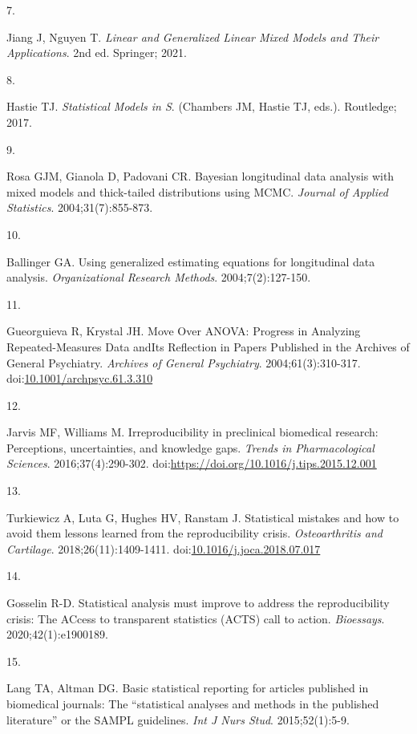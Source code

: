 \documentclass[
]{article}
\newlength{\cslhangindent}
\newlength{\csllabelwidth}
\newlength{\cslentryspacingunit} %
\newenvironment{CSLReferences}[2] %
 {%
  \setlength{\parindent}{0pt}
  \ifodd #1
  \let\oldpar\par
  \def\par{\hangindent=\cslhangindent\oldpar}
  \fi
  \setlength{\parskip}{#2\cslentryspacingunit}
 }%
 {}
\newcommand{\CSLLeftMargin}[1]{\parbox[t]{\csllabelwidth}{#1}}
\newcommand{\CSLRightInline}[1]{\parbox[t]{\linewidth - \csllabelwidth}{#1}\break}
\begin{document}
\begin{CSLReferences}{0}{0}
\leavevmode{}%
\CSLLeftMargin{7. }%
\CSLRightInline{Jiang J, Nguyen T. \emph{Linear and Generalized Linear
Mixed Models and Their Applications}. 2nd ed. Springer; 2021.}

\leavevmode{}%
\CSLLeftMargin{8. }%
\CSLRightInline{Hastie TJ. \emph{Statistical Models in {S}}. (Chambers
JM, Hastie TJ, eds.). Routledge; 2017.}

\leavevmode{}%
\CSLLeftMargin{9. }%
\CSLRightInline{Rosa GJM, Gianola D, Padovani CR. Bayesian longitudinal
data analysis with mixed models and thick-tailed distributions using
{MCMC}. \emph{Journal of Applied Statistics}. 2004;31(7):855-873.}

\leavevmode{}%
\CSLLeftMargin{10. }%
\CSLRightInline{Ballinger GA. Using generalized estimating equations for
longitudinal data analysis. \emph{Organizational Research Methods}.
2004;7(2):127-150.}

\leavevmode{}%
\CSLLeftMargin{11. }%
\CSLRightInline{Gueorguieva R, Krystal JH. {Move Over ANOVA: Progress in
Analyzing Repeated-Measures Data andIts Reflection in Papers Published
in the Archives of General Psychiatry}. \emph{Archives of General
Psychiatry}. 2004;61(3):310-317.
doi:\href{https://doi.org/10.1001/archpsyc.61.3.310}{10.1001/archpsyc.61.3.310}}

\leavevmode{}%
\CSLLeftMargin{12. }%
\CSLRightInline{Jarvis MF, Williams M. Irreproducibility in preclinical
biomedical research: Perceptions, uncertainties, and knowledge gaps.
\emph{Trends in Pharmacological Sciences}. 2016;37(4):290-302.
doi:\url{https://doi.org/10.1016/j.tips.2015.12.001}}

\leavevmode{}%
\CSLLeftMargin{13. }%
\CSLRightInline{Turkiewicz A, Luta G, Hughes HV, Ranstam J. Statistical
mistakes and how to avoid them {\textendash} lessons learned from the
reproducibility crisis. \emph{Osteoarthritis and Cartilage}.
2018;26(11):1409-1411.
doi:\href{https://doi.org/10.1016/j.joca.2018.07.017}{10.1016/j.joca.2018.07.017}}

\leavevmode{}%
\CSLLeftMargin{14. }%
\CSLRightInline{Gosselin R-D. Statistical analysis must improve to
address the reproducibility crisis: The {ACcess} to transparent
statistics ({ACTS}) call to action. \emph{Bioessays}.
2020;42(1):e1900189.}

\leavevmode{}%
\CSLLeftMargin{15. }%
\CSLRightInline{Lang TA, Altman DG. Basic statistical reporting for
articles published in biomedical journals: The {``statistical analyses
and methods in the published literature''} or the {SAMPL} guidelines.
\emph{Int J Nurs Stud}. 2015;52(1):5-9.}

\end{CSLReferences}
\end{document}

